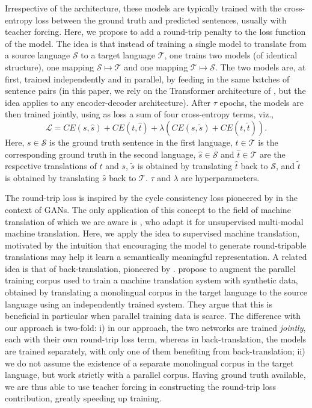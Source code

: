 \documentclass[11pt,a4paper]{article}
\begin{document}
Irrespective of the architecture, these models are typically trained with the cross-entropy loss between the ground truth and predicted sentences, usually with teacher forcing.
Here, we propose to add a round-trip penalty to the loss function of the model. The idea is that instead of training a single model to translate from a source language $\mathcal{S}$ to a target language $\mathcal{T}$, one trains two models (of identical structure), one mapping $\mathcal{S}\mapsto \mathcal{T}$ and one mapping $\mathcal{T}\mapsto \mathcal{S}$. The two models are, at first, trained independently and in parallel, by feeding in the same batches of sentence pairs (in this paper, we rely on the Transformer architecture of \citet{transformer}, but the idea applies to any encoder-decoder architecture). After $\tau$ epochs, the models are then trained jointly, using as loss a sum of four cross-entropy terms, viz.,
\begin{equation}
\mathcal{L} = CE(s, \hat{s}) + CE(t, \hat{t}) + \lambda \left( CE(s, \tilde{s}) + CE(t, \tilde{t})\right).
\label{eq:RTL}
\end{equation}
Here, $s\in\mathcal{S}$ is the ground truth sentence in the first language, $t\in\mathcal{T}$ is the corresponding ground truth in the second language, $\hat{s}\in\mathcal{S}$ and $\hat{t}\in\mathcal{T}$ are the respective translations of $t$ and $s$, $\tilde{s}$ is obtained by translating $\hat{t}$ back to $\mathcal{S}$, and $\tilde{t}$ is obtained by translating $\hat{s}$ back to $\mathcal{T}$. $\tau$ and $\lambda$ are hyperparameters.

The round-trip loss is inspired by the cycle consistency loss pioneered by \citet{CycleGAN2017} in the context of GANs. The only application of this concept to the field of machine translation of which we are aware is \citet{su:2018}, who adapt it for unsupervised multi-modal machine translation. Here, we apply the idea to supervised machine translation, motivated by the intuition that encouraging the model to generate round-tripable translations may help it learn a semantically meaningful representation. A related idea is that of back-translation, pioneered by \citet{backtrans}. \citeauthor{backtrans} propose to augment the parallel training corpus used to train a machine translation system with synthetic data, obtained by translating a monolingual corpus in the target language to the source language using an independently trained system. They argue that this is beneficial in particular when parallel training data is scarce. The difference with our approach is two-fold: i) in our approach, the two networks are trained \emph{jointly}, each with their own round-trip loss term, whereas in back-translation, the models are trained separately, with only one of them benefiting from back-translation; ii) we do not assume the existence of a separate monolingual corpus in the target language, but work strictly with a parallel corpus. Having ground truth available, we are thus able to use teacher forcing in constructing the round-trip loss contribution, greatly speeding up training.
\end{document}
